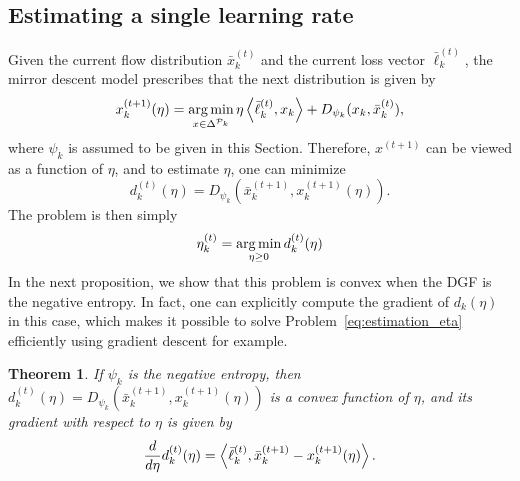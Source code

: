 \documentclass{sig-alternate-ipsn13}
\newtheorem{theorem}{Theorem}
\begin{document}
\subsection{Estimating a single learning rate}
Given the current flow distribution $\bar x^{(t)}_k$ and the current loss vector $\bar \ell^{(t)}_k$, the mirror descent model prescribes that the next distribution is given by
\begin{equation}
\label{eq:MD_update_estimation}
x_k^{(t+1)}(\eta) = \operatorname*{arg\,min}_{x \in \Delta^{\mathcal{P}_k}} \eta \left\langle \bar \ell_k^{(t)}, x_k \right\rangle + D_{\psi_k}(x_k, \bar x^{(t)}_k),
\end{equation}
where $\psi_k$ is assumed to be given in this Section. Therefore, $x^{(t+1)}$ can be viewed as a function of $\eta$, and to estimate $\eta$, one can minimize
\[
d^{(t)}_k(\eta) = D_{\psi_k}(\bar x_k^{(t+1)}, x_k^{(t+1)}(\eta)).
\]
The problem is then simply
\begin{equation}
\label{eq:estimation_eta}
\eta_k^{(t)} = \operatorname*{arg\,min}_{\eta \geq 0} d^{(t)}_k(\eta)
\end{equation}
In the next proposition, we show that this problem is convex when the DGF is the negative entropy. In fact, one can explicitly compute the gradient of $d_k(\eta)$ in this case, which makes it possible to solve Problem~\eqref{eq:estimation_eta} efficiently using gradient descent for example.
\begin{theorem}
If $\psi_k$ is the negative entropy, then $d_k^{(t)}(\eta) = D_{\psi_k}(\bar x_k^{(t+1)}, x_k^{(t+1)}(\eta))$ is a convex function of $\eta$, and its gradient with respect to $\eta$ is given by
\[
\frac{d}{d\eta} d_k^{(t)}(\eta) = \left\langle \bar \ell^{(t)}_{k}, {\bar x^{(t+1)}_k} - x^{(t+1)}_k(\eta) \right\rangle.
\]
\end{theorem}
\end{document}
